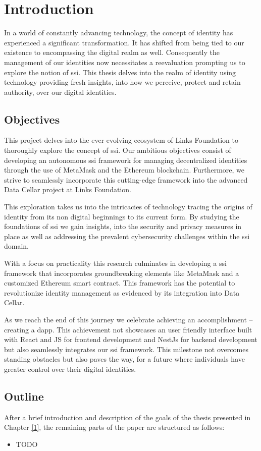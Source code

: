 \chapter{Introduction} \label{ch:introduction}

In a world of constantly advancing technology, the concept of identity has experienced a significant transformation. It has shifted from being tied to our existence to 
encompassing the digital realm as well. Consequently the management of our identities now necessitates a reevaluation prompting us to explore the notion of \gls{ssi}. 
This thesis delves into the realm of identity using technology providing fresh insights, into how we perceive, protect and retain authority, over our digital identities.

\section{Objectives} 

This project delves into the ever-evolving ecosystem of Links Foundation to thoroughly explore the concept of \gls{ssi}. Our ambitious objectives 
consist of developing an autonomous \gls{ssi} framework for managing decentralized identities through the use of MetaMask and the Ethereum blockchain. Furthermore, we strive to 
seamlessly incorporate this cutting-edge framework into the advanced Data Cellar project at Links Foundation.

This exploration takes us into the intricacies of technology tracing the origins of identity from its non digital beginnings to its current form. By studying the foundations
of \gls{ssi} we gain insights, into the security and privacy measures in place as well as addressing the prevalent cybersecurity challenges within the \gls{ssi} domain.

With a focus on practicality this research culminates in developing a \gls{ssi} framework that incorporates groundbreaking elements like MetaMask and a customized Ethereum smart 
contract. This framework has the potential to revolutionize identity management as evidenced by its integration into Data Cellar.

As we reach the end of this journey we celebrate achieving an accomplishment – creating a \gls{dapp}. This achievement not showcases an user friendly interface 
built with React and JS for frontend development and NestJs for backend development but also seamlessly integrates our \gls{ssi} framework. This milestone not overcomes standing 
obstacles but also paves the way, for a future where individuals have greater control over their digital identities.

\section{Outline}

After a brief introduction and description of the goals of the thesis presented in Chapter 
\hyperref[ch:introduction]{[1]}, the remaining parts of the paper are structured as follows:

\begin{itemize}
    \item TODO
\end{itemize}


